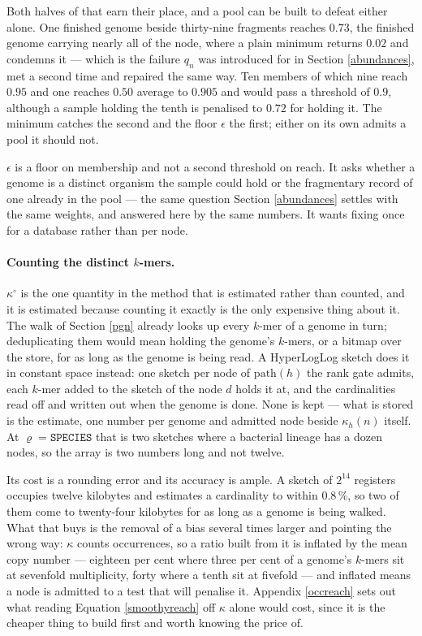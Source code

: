 \documentclass[pdflatex,sn-vancouver-num]{sn-jnl}
\begin{document}
    Both halves of that earn their place, and a pool can be built to defeat either alone. One
    finished genome beside thirty-nine fragments reaches $0.73$, the finished genome carrying nearly
    all of the node, where a plain minimum returns $0.02$ and condemns it --- which is the failure
    $q_n$ was introduced for in Section \ref{abundances}, met a second time and repaired the same
    way. Ten members of which nine reach $0.95$ and one reaches $0.50$ average to $0.905$ and would
    pass a threshold of $0.9$, although a sample holding the tenth is penalised to $0.72$ for
    holding it. The minimum catches the second and the floor $\epsilon$ the first; either on its own
    admits a pool it should not.

    $\epsilon$ is a floor on membership and not a second threshold on reach. It asks whether a
    genome is a distinct organism the sample could hold or the fragmentary record of one already in
    the pool --- the same question Section \ref{abundances} settles with the same weights, and
    answered here by the same numbers. It wants fixing once for a database rather than per node.

    \paragraph{Counting the distinct $k$-mers.} $\kappa^{\circ}$ is the one quantity in the method
    that is estimated rather than counted, and it is estimated because counting it exactly is the
    only expensive thing about it. The walk of Section \ref{pgn} already looks up every $k$-mer of a
    genome in turn; deduplicating them would mean holding the genome's $k$-mers, or a bitmap over the
    store, for as long as the genome is being read. A HyperLogLog sketch \citep{flajolet2007hyperloglog}
    does it in constant space instead: one sketch per node of $\mathrm{path}(h)$ the rank gate
    admits, each $k$-mer added to the sketch of the node $d$ holds it at, and the cardinalities read
    off and written out when the genome is done. None is kept --- what is stored is the estimate, one
    number per genome and admitted node beside $\kappa_h(n)$ itself. At $\varrho =
    \texttt{SPECIES}$ that is two sketches where a bacterial lineage has a dozen nodes, so the array
    is two numbers long and not twelve.

    Its cost is a rounding error and its accuracy is ample. A sketch of $2^{14}$ registers occupies
    twelve kilobytes and estimates a cardinality to within $0.8\,\%$, so two of them come to
    twenty-four kilobytes for as long as a genome is being walked. What that buys is
    the removal of a bias several times larger and pointing the wrong way: $\kappa$ counts
    occurrences, so a ratio built from it is inflated by the mean copy number ---
    eighteen per cent where three per cent of a genome's $k$-mers sit at sevenfold multiplicity,
    forty where a tenth sit at fivefold --- and inflated means a node is admitted to a test that will
    penalise it. Appendix \ref{occreach} sets out what reading Equation \eqref{smoothyreach} off
    $\kappa$ alone would cost, since it is the cheaper thing to build first and worth knowing the
    price of.
\end{document}
